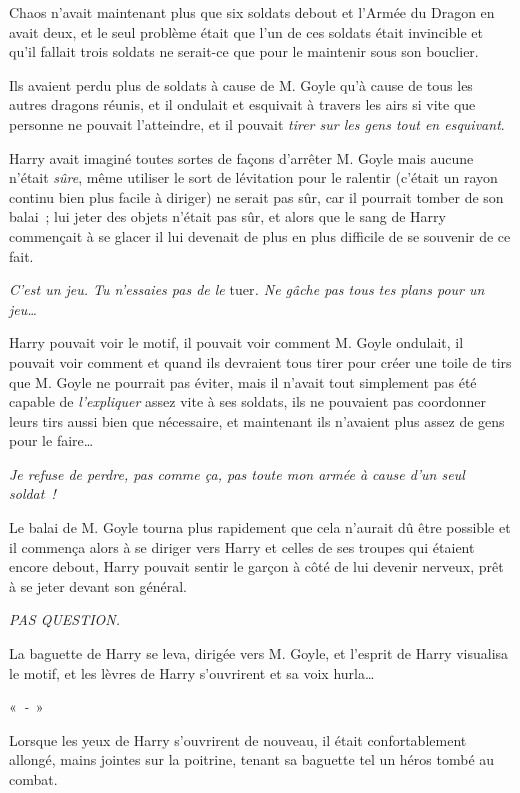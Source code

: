 Chaos n'avait maintenant plus que six soldats debout et l'Armée du Dragon en avait deux, et le seul problème était que l'un de ces soldats était invincible et qu'il fallait trois soldats ne serait-ce que pour le maintenir sous son bouclier.

Ils avaient perdu plus de soldats à cause de M. Goyle qu'à cause de tous les autres dragons réunis, et il ondulait et esquivait à travers les airs si vite que personne ne pouvait l'atteindre, et il pouvait \emph{tirer sur les gens tout en esquivant}.

Harry avait imaginé toutes sortes de façons d'arrêter M. Goyle mais aucune n'était \emph{sûre}, même utiliser le sort de lévitation pour le ralentir (c'était un rayon continu bien plus facile à diriger) ne serait pas sûr, car il pourrait tomber de son balai~; lui jeter des objets n'était pas sûr, et alors que le sang de Harry commençait à se glacer il lui devenait de plus en plus difficile de se souvenir de ce fait.

\emph{C'est un jeu. Tu n'essaies pas de le} tuer\emph{. Ne gâche pas tous tes plans pour un jeu…}

Harry pouvait voir le motif, il pouvait voir comment M. Goyle ondulait, il pouvait voir comment et quand ils devraient tous tirer pour créer une toile de tirs que M. Goyle ne pourrait pas éviter, mais il n'avait tout simplement pas été capable de \emph{l'expliquer} assez vite à ses soldats, ils ne pouvaient pas coordonner leurs tirs aussi bien que nécessaire, et maintenant ils n'avaient plus assez de gens pour le faire…

\emph{Je refuse de perdre, pas comme ça, pas toute mon armée à cause d'un seul soldat~!}

Le balai de M. Goyle tourna plus rapidement que cela n'aurait dû être possible et il commença alors à se diriger vers Harry et celles de ses troupes qui étaient encore debout, Harry pouvait sentir le garçon à côté de lui devenir nerveux, prêt à se jeter devant son général.

\emph{PAS QUESTION.}

La baguette de Harry se leva, dirigée vers M. Goyle, et l'esprit de Harry visualisa le motif, et les lèvres de Harry s'ouvrirent et sa voix hurla…

«~\emph{-}~»

\later

Lorsque les yeux de Harry s'ouvrirent de nouveau, il était confortablement allongé, mains jointes sur la poitrine, tenant sa baguette tel un héros tombé au combat.


